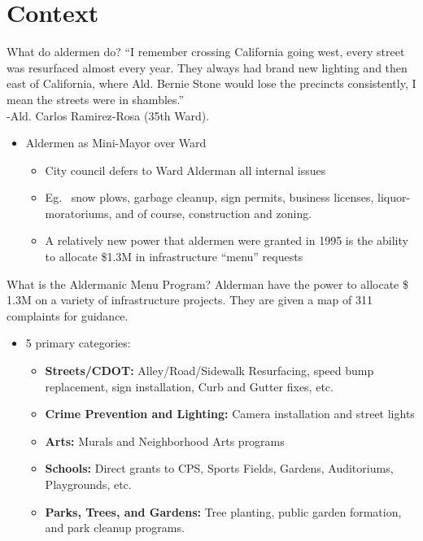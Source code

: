 \section{Context}
\begin{frame}{What do aldermen do?}
``I remember crossing California going west, every street was resurfaced almost every year. They always had brand new lighting and then east of California, where Ald. Bernie Stone would lose the precincts consistently, I mean the streets were in shambles.'' \\
-Ald. Carlos Ramirez-Rosa (35th Ward).
\newline
\begin{itemize}
    \item Aldermen as Mini-Mayor over Ward
    \begin{itemize}
        \item City council defers to Ward Alderman all internal issues
        \item Eg. \ snow plows, garbage cleanup, sign permits, business licenses, liquor-moratoriums, and of course, construction and zoning.
        \item A relatively new power that aldermen were granted in 1995 is the ability to allocate \$1.3M in infrastructure ``menu'' requests 
    \end{itemize}
\end{itemize}
\end{frame}

\begin{frame}{What is the Aldermanic Menu Program?}
    Alderman have the power to allocate \$ 1.3M on a variety of infrastructure projects. They are given a map of 311 complaints for guidance.
\begin{itemize}
    \item  5 primary categories:
    \begin{itemize}
        \item \textbf{Streets/CDOT:} Alley/Road/Sidewalk Resurfacing, speed bump replacement, sign installation, Curb and Gutter fixes, etc. 
        \item \textbf{Crime Prevention and Lighting:} Camera installation and street lights
        \item \textbf{Arts:} Murals and Neighborhood Arts programs
        \item \textbf{Schools:} Direct grants to CPS, Sports Fields, Gardens, Auditoriums, Playgrounds, etc. 
        \item \textbf{Parks, Trees, and Gardens:} Tree planting, public garden formation, and park cleanup programs. 
    \end{itemize}
\end{itemize}
\end{frame}
